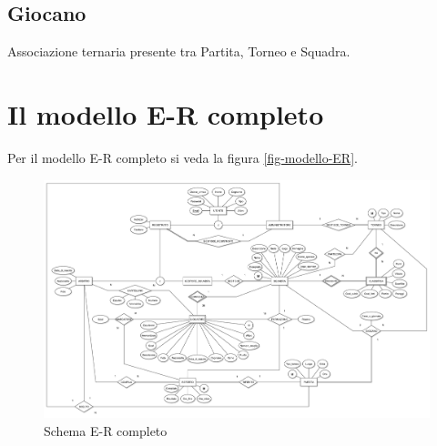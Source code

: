 	\subsection{Giocano}
	Associazione ternaria presente tra Partita, Torneo e Squadra.
	

\section{Il modello E-R completo}
Per il modello E-R completo si veda la figura \vref{fig-modello-ER}.


\begin{figure}[h]
	\centering
	\includegraphics[height=1\textwidth,
	angle=90]
	{immagini/diagramma-ER-completo}
	
	\caption{Schema E-R completo}
	
	\label{fig-modello-ER}
\end{figure}	